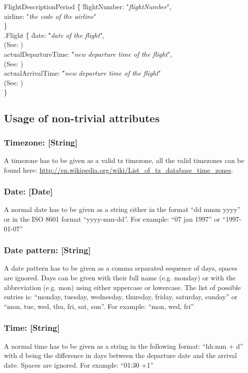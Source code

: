 \documentclass[a4paper,11pt]{article}
\begin{document}
\begin{tabbing}
FlightDescriptionPeriod \= \{ \= flightNumber: "\textit{flightNumber}", \\
	\> \> airline: "\textit{the code of the airline}" \\
\> \} \\
\> .Flight \= \{ \= date: \= "\textit{date of the flight}", \\
        \> \> \> \> (See: ) \\
	\> \> actualDepartureTime: \= "\textit{new departure time of the flight}", \\
        \> \> \>(See: ) \\
	\> \> actualArrivalTime: \= "\textit{new departure time of the flight}" \\
        \> \> \>(See: ) \\
\> \} \\
\end{tabbing}


\subsection*{Usage of non-trivial attributes}
\subsubsection*{Timezone: [String]}
\label{Timezone}
A timezone has to be given as a valid tz timezone, all the valid timezones can be found here: \url{http://en.wikipedia.org/wiki/List_of_tz_database_time_zones}.

\subsubsection*{Date: [Date]}
\label{Date}
A normal date has to be given as a string either in the format ``dd mmm yyyy'' or in the ISO 8601 format ``yyyy-mm-dd''. \newline
	For example: ``07 jan 1997'' or ``1997-01-07''
	
\subsubsection*{Date pattern: [String]}
\label{Datepattern}
A date pattern has to be given as a comma separated sequence of days, spaces are ignored. Days can be given with their full name (e.g. monday) or with the abbreviation (e.g. mon) using either uppercase or lowercase. The list of possible entries is: ``monday, tuesday, wednesday, thursday, friday, saturday, sunday'' or ``mon, tue, wed, thu, fri, sat, sun''. \newline
For example: ``mon, wed, fri''


\subsubsection*{Time: [String]}
\label{Time}
A normal time has to be given as a string in the following format: ``hh:mm + d'' with d being the difference in days between the departure date and the arrival date. Spaces are ignored. \newline
For example: ``01:30 +1''
\end{document}
